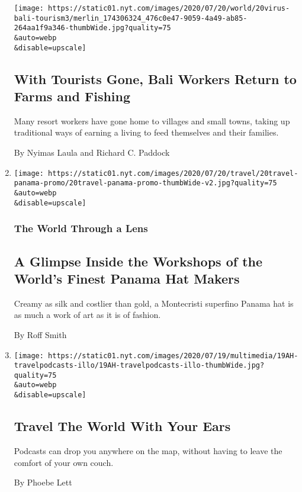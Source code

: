 \begin{enumerate}
  \texttt{[image: https://static01.nyt.com/images/2020/07/20/world/20virus-bali-tourism3/merlin\_174306324\_476c0e47-9059-4a49-ab85-264aa1f9a346-thumbWide.jpg?quality=75\\\&auto=webp\\\&disable=upscale]}

  \hypertarget{with-tourists-gone-bali-workers-return-to-farms-and-fishing}{%
  \subsection{With Tourists Gone, Bali Workers Return to Farms and
  Fishing}\label{with-tourists-gone-bali-workers-return-to-farms-and-fishing}}

  Many resort workers have gone home to villages and small towns, taking
  up traditional ways of earning a living to feed themselves and their
  families.

  By Nyimas Laula and Richard C. Paddock
\item
  \href{/2020/07/20/travel/panama-hats-ecuador.html}{}

  \texttt{[image: https://static01.nyt.com/images/2020/07/20/travel/20travel-panama-promo/20travel-panama-promo-thumbWide-v2.jpg?quality=75\\\&auto=webp\\\&disable=upscale]}

  \hypertarget{the-world-through-a-lens-2}{%
  \subsubsection{The World Through a
  Lens}\label{the-world-through-a-lens-2}}

  \hypertarget{a-glimpse-inside-the-workshops-of-the-worlds-finest-panama-hat-makers}{%
  \subsection{A Glimpse Inside the Workshops of the World's Finest
  Panama Hat
  Makers}\label{a-glimpse-inside-the-workshops-of-the-worlds-finest-panama-hat-makers}}

  Creamy as silk and costlier than gold, a Montecristi superfino Panama
  hat is as much a work of art as it is of fashion.

  By Roff Smith
\item
  \href{/2020/07/18/at-home/coronavirus-travel-podcasts.html}{}

  \texttt{[image: https://static01.nyt.com/images/2020/07/19/multimedia/19AH-travelpodcasts-illo/19AH-travelpodcasts-illo-thumbWide.jpg?quality=75\\\&auto=webp\\\&disable=upscale]}

  \hypertarget{travel-the-world-with-your-ears}{%
  \subsection{Travel The World With Your
  Ears}\label{travel-the-world-with-your-ears}}

  Podcasts can drop you anywhere on the map, without having to leave the
  comfort of your own couch.

  By Phoebe Lett
\end{enumerate}

